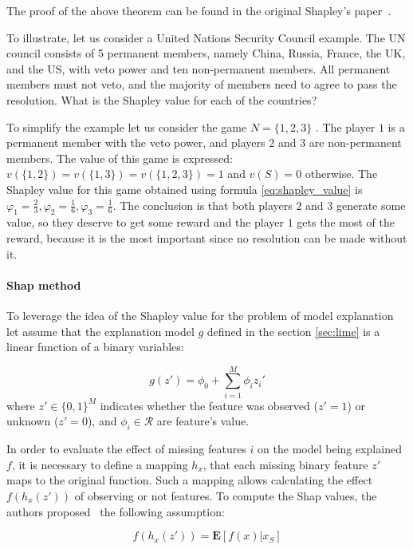 The proof of the above theorem can be found in the original Shapley's paper~\cite{ShapleyProof}. 

To illustrate, let us consider a United Nations Security Council example. The UN council consists of 5 permanent members, namely China, Russia, France, the UK, and the US, with veto power and ten non-permanent members. All permanent members must not veto, and the majority of members need to agree to pass the resolution.  What is the Shapley value for each of the countries? 

To simplify the example let us consider the game $N = \{1,2,3 \}$ . The player $1$ is a permanent member with the veto power, and players $2$ and $3$ are non-permanent members. The value of this game is expressed: $ v( \{1,2 \})= v( \{1,3 \})= v( \{1,2,3\})=1$ and $v(S)=0$ otherwise. 
The Shapley value for this game obtained using formula \ref{eq:shapley_value} is 
$\varphi_{1} = \frac{2}{3},\varphi_{2}= \frac{1}{6}, \varphi_{3 } =  \frac{1}{6} $.  The conclusion is that both players $2$ and $3$ generate some value, so they deserve to get some reward and the player $1$ gets the most of the reward, because it is the most important since no resolution can be made without it. 

\paragraph{Shap method} \mbox{}

To leverage the idea of the Shapley value for the problem of model explanation let assume that the explanation model $g$ defined in the section \ref{sec:lime} is a linear function of a binary variables: 

\begin{equation}
    g(z') = \phi_0 + \sum_{i=1}^{M} \phi_{i}z_i'
\end{equation}
where $z' \in \{ 0, 1\}^{M}$ indicates whether the feature was observed ($z'=1$) or unknown ($z'=0$), and $\phi_i \in \mathcal{R}$ are feature's value.

In order to evaluate the effect of missing features $i$ on the model being explained $f$, it is necessary to define a mapping $h_x$, that each missing binary feature $z'$ maps to the original function. Such a mapping allows calculating the effect $f(h_x(z'))$ of observing or not features. To compute the Shap values, the authors proposed~\cite{shap} the following assumption: 

\begin{equation} \label{eq:shap assumtion}
    f(h_x(z')) = \mathbf{E}[f(x)|x_S]
\end{equation}

